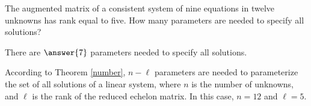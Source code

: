 \documentclass{ximera}
\begin{document}
\begin{exercise} \label{c2.4.2b}
The augmented matrix of a consistent system of nine equations in twelve
unknowns has rank equal to five.  How many parameters are needed to
specify all solutions?
\begin{prompt}
  There are $\answer{7}$ parameters needed to specify all solutions.
\end{prompt}
\begin{hint}
  According to Theorem \ref{number}, $n - \ell$
parameters are needed to parameterize the set of all solutions of a
linear system, where $n$ is the number of unknowns, and $\ell$ is the
rank of the reduced echelon matrix.  In this case, $n = 12$ and $\ell =
5$.
\end{hint}
\end{exercise}

\CEXER
\end{document}
